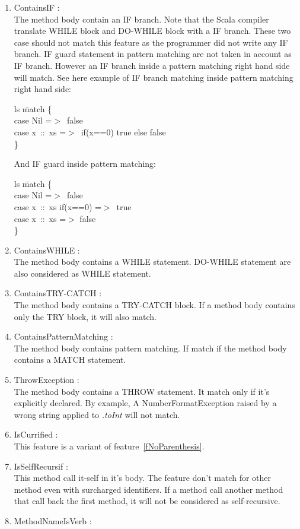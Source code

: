 \documentclass[12pt]{article}
\newcommand{\code}[1]{{\fontfamily{phv}\selectfont \small{\begin{tabbing} #1 \end{tabbing}}}}
\begin{document}
\begin{enumerate}
\item ContainsIF :\\
	The method body contain an IF branch. Note that the Scala compiler translate WHILE block and DO-WHILE block with a IF branch. These two case should not match this feature as the programmer did not write any IF branch. IF guard statement in pattern matching are not taken in account as IF branch. However an IF branch inside a pattern matching right hand side will match. See here example of IF branch matching inside pattern matching right hand side:
\code{
ls \=match \{\\
\>case Nil =$>$\ false\\
\>case x\ ::\ xs =$>$\ if(x==0) true else false\\
\}
}
And IF guard inside pattern matching:
\code{
ls \=match \{\\
\>case Nil =$>$\ false\\
\>case x\ ::\ xs if(x==0) =$>$\ true\\
\>case x\ ::\ xs =$>$ false\\
\}
}
\item ContainsWHILE :\\
	The method body contains a WHILE statement. DO-WHILE statement are also considered as WHILE statement.
\item ContainsTRY-CATCH :\\
	The method body contains a TRY-CATCH block. If a method body contains only the TRY block, it will also match.
\item ContainsPatternMatching : \\
	The method body contains pattern matching. If match if the method body contains a MATCH statement.
\item ThrowException :\\
	The method body contains a THROW statement. It match only if it's explicitly declared. By example, A NumberFormatException raised by a wrong string applied to \textit{.toInt} will not match.
\item IsCurrified : \\
	This feature is a variant of feature~\ref{fNoParenthesis}.
\item IsSelfRecursif : \\
	This method call it-self in it's body. The feature don't match for other method even with surcharged identifiers. If a method call another method that call back the first method, it will not be considered as self-recursive.
\item MethodNameIsVerb : \label{fVerb}\\

\end{enumerate}
\end{document}
